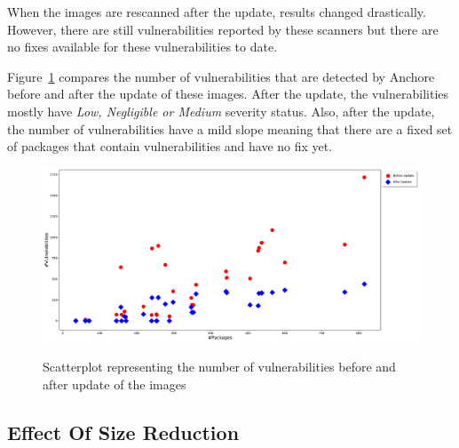 \documentclass[a4paper,num-refs]{oup-contemporary}
\begin{document}
When the images are rescanned after the update, results changed drastically. However, there are still
vulnerabilities reported by these scanners but there are no fixes available for these vulnerabilities
to date.

Figure~\ref{fig:graph2} compares the number of vulnerabilities that are detected by Anchore before and after 
the update of these images.
After the update, the vulnerabilities mostly have \textit{Low, Negligible or Medium} severity status.
Also, after the update, the number of vulnerabilities have a mild slope meaning that there
are a fixed set of packages that contain vulnerabilities and have no fix yet.
\begin{figure}[!htb]
        {\includegraphics[width=\textwidth]
        {Figures/afterupdatewithpackage.pdf}}
        \caption{\label{fig:graph2} Scatterplot representing the number of vulnerabilities before and 
	after update of the images}
      \end{figure}
\subsection{Effect Of Size Reduction}


\end{document}
